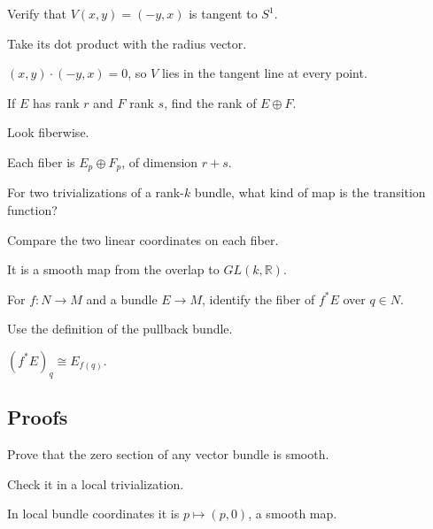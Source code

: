 \begin{exercise}\label{exr:vii07-ped-02}
Verify that \(V(x,y)=(-y,x)\) is tangent to \(S^1\).
\end{exercise}
\begin{hint}
Take its dot product with the radius vector.
\end{hint}
\begin{solution}
\((x,y)\cdot(-y,x)=0\), so \(V\) lies in the tangent line at every point.
\end{solution}

\begin{exercise}\label{exr:vii07-ped-03}
If \(E\) has rank \(r\) and \(F\) rank \(s\), find the rank of \(E\oplus F\).
\end{exercise}
\begin{hint}
Look fiberwise.
\end{hint}
\begin{solution}
Each fiber is \(E_p\oplus F_p\), of dimension \(r+s\).
\end{solution}

\begin{exercise}\label{exr:vii07-ped-04}
For two trivializations of a rank-\(k\) bundle, what kind of map is the transition function?
\end{exercise}
\begin{hint}
Compare the two linear coordinates on each fiber.
\end{hint}
\begin{solution}
It is a smooth map from the overlap to \(GL(k,\mathbb R)\).
\end{solution}

\begin{exercise}\label{exr:vii07-ped-05}
For \(f:N\to M\) and a bundle \(E\to M\), identify the fiber of \(f^*E\) over \(q\in N\).
\end{exercise}
\begin{hint}
Use the definition of the pullback bundle.
\end{hint}
\begin{solution}
\((f^*E)_q\cong E_{f(q)}\).
\end{solution}

\subsection*{Proofs}

\begin{exercise}\label{exr:vii07-ped-06}
Prove that the zero section of any vector bundle is smooth.
\end{exercise}
\begin{hint}
Check it in a local trivialization.
\end{hint}
\begin{solution}
In local bundle coordinates it is \(p\mapsto(p,0)\), a smooth map.
\end{solution}

